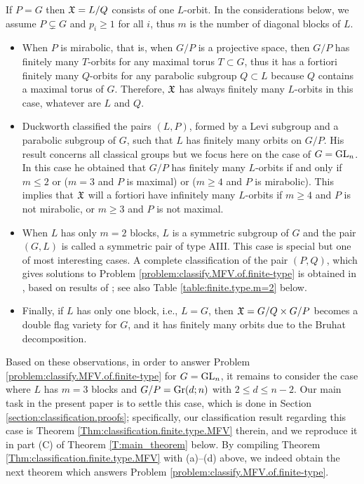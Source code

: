 \documentclass[12pt,reqno]{amsart}
\begin{document}
If $P=G$ then $\mathfrak{X}=L/Q$ consists of one $L$-orbit. In the considerations below, we assume $P\subsetneq G$ and $p_i\geq 1$ for all $i$, thus $m$ is the number of diagonal blocks of $L$.
\begin{itemize}
    \item[\rm (a)]
    When $P$ is mirabolic, that is, when $G/P$ is a projective space, then $G/P$ has finitely many $T$-orbits for any maximal torus $T\subset G$, thus it has a fortiori finitely many $Q$-orbits for any parabolic subgroup $Q\subset L$ because $Q$ contains a maximal torus of $G$. Therefore, $\mathfrak{X}$ has always finitely many $L$-orbits in this case, whatever are $L$ and $Q$.
    \item[\rm (b)]
    Duckworth \cite{Duckworth} classified the pairs $(L,P)$, formed by a Levi subgroup and a parabolic subgroup of $G$, such that $L$ has finitely many orbits on $G/P$. His result concerns all classical groups but we focus here on the case of $G=\mathrm{GL}_n$.
In this case he obtained that $G/P$ has finitely many $L$-orbits if and only if $m\leq 2$ or ($m=3$ and $P$ is maximal) or ($m\geq 4$ and $P$ is mirabolic). This implies that $\mathfrak{X}$ will a fortiori have infinitely many $L$-orbits if $m\geq 4$ and $P$ is not mirabolic, or $m\geq 3$ and $P$ is not maximal.
    \item[\rm (c)] When $L$ has only $m=2$ blocks, $L$ is a symmetric subgroup of $G$ and the pair $(G,L)$ is called a symmetric pair of type AIII.
This case is special but one of most interesting cases.  A complete classification of the pair $ (P, Q) $, which gives solutions to
Problem \ref{problem:classify.MFV.of.finite-type} is obtained in \cite[Corollary 8.6]{Fresse.Nishiyama.Overview.2023}, based on results of \cite{Homma.2021}; see also Table \ref{table:finite.type.m=2} below.
    \item[\rm (d)] Finally, if $L$ has only one block, i.e., $L=G$, then $\mathfrak{X}=G/Q\times G/P$ becomes a double flag variety for $G$, and it has finitely many orbits due to the Bruhat decomposition.
\end{itemize}
Based on these observations,
in order to answer Problem \ref{problem:classify.MFV.of.finite-type} for $G=\mathrm{GL}_n$, it remains to consider the case where $L$ has $m=3$ blocks and $G/P=\mathrm{Gr}(d;n)$ with $2\leq d\leq n-2$.
Our main task in the present paper is to settle this case, which is done in Section \ref{section:classification.proofs}; specifically, our classification result regarding this case is Theorem \ref{Thm:classification.finite.type.MFV} therein, and we reproduce it in part (C) of Theorem \ref{T:main_theorem} below. By compiling Theorem \ref{Thm:classification.finite.type.MFV} with (a)--(d) above, we indeed obtain the next theorem which answers Problem \ref{problem:classify.MFV.of.finite-type}.
\end{document}
